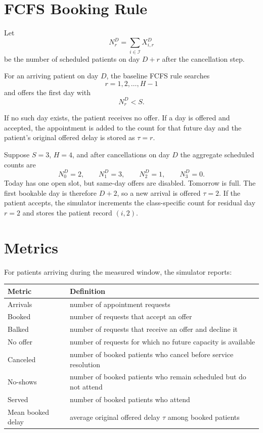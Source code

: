\documentclass[11pt]{article}
\begin{document}
\section{FCFS Booking Rule}

Let
\[
N_r^D = \sum_{i\in\mathcal I} X_{i,r}^{D}
\]
be the number of scheduled patients on day \(D+r\) after the cancellation step.

For an arriving patient on day \(D\), the baseline FCFS rule searches
\[
r=1,2,\dots,H-1
\]
and offers the first day with
\[
N_r^D < S.
\]

If no such day exists, the patient receives no offer. If a day is offered and accepted, the
appointment is added to the count for that future day and the patient's original offered delay is
stored as \(\tau=r\).

\begin{examplebox}[title={One-Day Example}]
Suppose \(S=3\), \(H=4\), and after cancellations on day \(D\) the aggregate scheduled counts are
\[
N_0^D=2,\qquad N_1^D=3,\qquad N_2^D=1,\qquad N_3^D=0.
\]
Today has one open slot, but same-day offers are disabled. Tomorrow is full. The first bookable day
is therefore \(D+2\), so a new arrival is offered \(\tau=2\). If the patient accepts, the simulator
increments the class-specific count for residual day \(r=2\) and stores the patient record
\((i,2)\).
\end{examplebox}

\section{Metrics}

For patients arriving during the measured window, the simulator reports:
\begin{center}
\small
\begin{tabular}{L{0.28\textwidth} L{0.62\textwidth}}
\toprule
\textbf{Metric} & \textbf{Definition} \\
\midrule
Arrivals & number of appointment requests \\
\addlinespace
Booked & number of requests that accept an offer \\
\addlinespace
Balked & number of requests that receive an offer and decline it \\
\addlinespace
No offer & number of requests for which no future capacity is available \\
\addlinespace
Canceled & number of booked patients who cancel before service resolution \\
\addlinespace
No-shows & number of booked patients who remain scheduled but do not attend \\
\addlinespace
Served & number of booked patients who attend \\
\addlinespace
Mean booked delay & average original offered delay \(\tau\) among booked patients \\
\bottomrule
\end{tabular}
\normalsize
\end{center}
\end{document}
